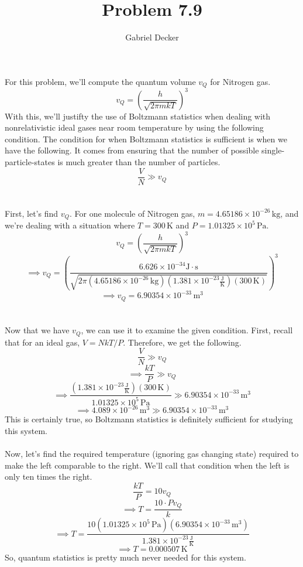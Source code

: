 \documentclass[12pt]{article}
\title{Problem 7.9}
\author{Gabriel Decker}
\newcommand{\boltzmannConstK}{1.381\times10^{-23}\frac{\text{J}}{\text{K}}}
\newcommand{\planckConst}{6.626\times10^{-34}\text{J}\cdot\text{s}}
\newcommand{\atmP}{1.01325\times10^5\,\text{Pa}}
\begin{document}
\maketitle
\begin{flushleft}

For this problem, we'll compute the quantum volume $v_Q$ for Nitrogen gas.
\begin{equation}
    v_Q=\left(\frac{h}{\sqrt{2\pi mkT}}\right)^3
\end{equation}
With this, we'll justifty the use of Boltzmann statistics when dealing with nonrelativistic ideal gases near room temperature by using the following condition.
The condition for when Boltzmann statistics is sufficient is when we have the following.
It comes from ensuring that the number of possible single-particle-states is much greater than the number of particles.
\begin{equation}
    \frac{V}{N}\gg v_Q
\end{equation}\\~\\

First, let's find $v_Q$.
For one molecule of Nitrogen gas, $m=4.65186\times10^{-26}\,\text{kg}$, and we're dealing with a situation where $T=300\,\text{K}$ and $P=\atmP$.
$$v_Q=\left(\frac{h}{\sqrt{2\pi mkT}}\right)^3$$
$$\implies v_Q=\left(\frac{\planckConst}{\sqrt{2\pi(4.65186\times10^{-26}\,\text{kg})(\boltzmannConstK)(300\,\text{K})}}\right)^3$$
$$\implies v_Q=6.90354\times10^{-33}\,\text{m}^3$$\\~\\

Now that we have $v_Q$, we can use it to examine the given condition.
First, recall that for an ideal gas, $V=NkT/P$.
Therefore, we get the following.
$$\frac{V}{N}\gg v_Q$$
$$\implies\frac{kT}{P}\gg v_Q$$
$$\implies\frac{(\boltzmannConstK)(300\,\text{K})}{\atmP}\gg 6.90354\times10^{-33}\,\text{m}^3$$
$$\implies4.089\times10^{-26}\,\text{m}^3\gg 6.90354\times10^{-33}\,\text{m}^3$$
This is certainly true, so Boltzmann statistics is definitely sufficient for studying this system.\\~\\

Now, let's find the required temperature (ignoring gas changing state) required to make the left comparable to the right.
We'll call that condition when the left is only ten times the right.
$$\frac{kT}{P}=10v_Q$$
$$\implies T=\frac{10\cdot Pv_Q}{k}$$
$$\implies T=\frac{10(\atmP)(6.90354\times10^{-33}\,\text{m}^3)}{\boltzmannConstK}$$
$$\implies T=0.000507\,\text{K}$$
So, quantum statistics is pretty much never needed for this system.



\end{flushleft}
\end{document}
